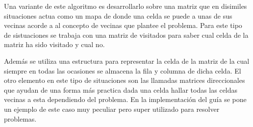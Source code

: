 Una variante de este algoritmo es desarrollarlo sobre una matriz que en disimiles situaciones actua como un mapa de donde una celda se puede a unas de sus vecinas acorde a al concepto de vecinas que plantee el problema. Para este tipo de sistuaciones se trabaja con una matriz de visitados para saber cual celda de la matriz ha sido visitado y cual no. 

Además se utiliza una estructura para representar la celda de la matriz de la cual siempre en todas las ocasiones se almacena la fila y columna de dicha celda. El otro elemento en este tipo de situaciones son las llamadas matrices direccionales que ayudan de una forma más practica dada una celda hallar todas las celdas vecinas a esta dependiendo del problema. En la implementación del guía se pone un ejemplo de este caso muy peculiar pero super utilizado para resolver problemas.